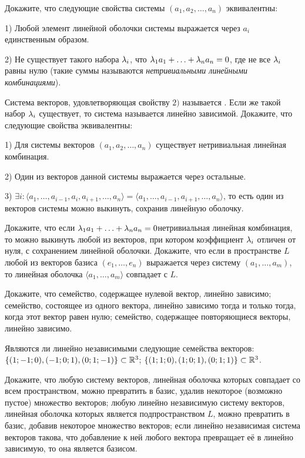 \documentclass[a4paper,12pt,fleqn]{article}
\begin{document}
Докажите, что следующие свойства системы $(a_1, a_2, \ldots, a_n)$ эквивалентны:
\begin{items}{-3}
\item[1)]
Любой элемент линейной оболочки системы выражается через $a_i$ единственным образом.
\item[2)]
Не существует такого набора $\lambda_i$, что $\lambda_1a_1+\ldots+\lambda_na_n=0$, где не все $\lambda_i$ равны нулю (такие суммы называются \emph{нетривиальными линейными комбинациями}).
\end{items}
Система векторов, удовлетворяющая свойству $2)$ называется . Если же такой набор $\lambda_i$ существует, то система называется линейно зависимой.
Докажите, что следующие свойства эквивалентны:
\begin{items}{-3}
\item[1)]
Для системы векторов $(a_1, a_2, \ldots, a_n)$ существует нетривиальная линейная комбинация.
\item[2)]
Один из векторов данной системы выражается через остальные.
\item[3)]
$\exists i: \langle a_1, \ldots, a_{i-1}, a_i, a_{i+1}, \ldots, a_n\rangle=\langle a_1, \ldots, a_{i-1}, a_{i+1}, \ldots, a_n\rangle$, то есть один из векторов системы можно выкинуть, сохранив линейную оболочку.
\end{items}
Докажите, что если $\lambda_1a_1+\ldots+\lambda_na_n=0$\т нетривиальная линейная комбинация, то можно выкинуть любой из векторов, при котором коэффициент $\lambda_i$ отличен от нуля, с сохранением линейной оболочки.
Докажите, что если в пространстве $L$ любой из векторов базиса $(e_1, \ldots, e_n)$ выражается через систему $(a_1, \ldots, a_m)$, то линейная оболочка $\langle a_1, \ldots, a_m \rangle$ совпадает с $L$.

Докажите, что
семейство, содержащее нулевой вектор, линейно зависимо;\\
семейство, состоящее из одного вектора, линейно зависимо тогда и только тогда, когда этот вектор равен нулю;
семейство, содержащее повторяющиеся векторы, линейно зависимо.

Являются ли линейно независимыми следующие семейства векторов:\\
$\{(1;-1;0),(-1;0;1),(0;1;-1)\}\subset\mathbb{R}^3$;
$\{(1;1;0),(1;0;1),(0;1;1)\}\subset\mathbb{R}^3$.

Докажите, что
любую систему векторов, линейная оболочка которых совпадает со всем пространством, можно превратить в базис, удалив некоторое (возможно пустое) множество векторов;
любую линейно независимую систему векторов, линейная оболочка которых является подпространством $L$, можно превратить в базис, добавив некоторое множество векторов;
если линейно независимая система векторов такова, что добавление к ней любого вектора превращает её в линейно зависимую, то она является базисом.
\end{document}
